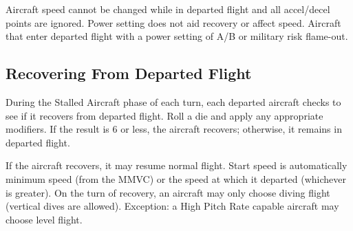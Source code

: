 Aircraft speed cannot be changed while in departed flight and all accel/decel points are ignored. Power setting does not aid recovery or affect speed. Aircraft that enter departed flight with a power setting of A/B or military risk flame-out.

\subsection{Recovering From Departed Flight}
During the Stalled Aircraft phase of each turn, each departed aircraft checks to see if it recovers from departed flight. Roll a die and apply any appropriate modifiers. If the result is 6 or less, the aircraft recovers; otherwise, it remains in departed flight.

If the aircraft recovers, it may resume normal flight. Start speed is automatically minimum speed (from the MMVC) or the speed at which it departed (whichever is greater). On the turn of recovery, an aircraft may only choose diving flight (vertical dives are allowed). Exception: a High Pitch Rate capable aircraft may choose level flight.   

